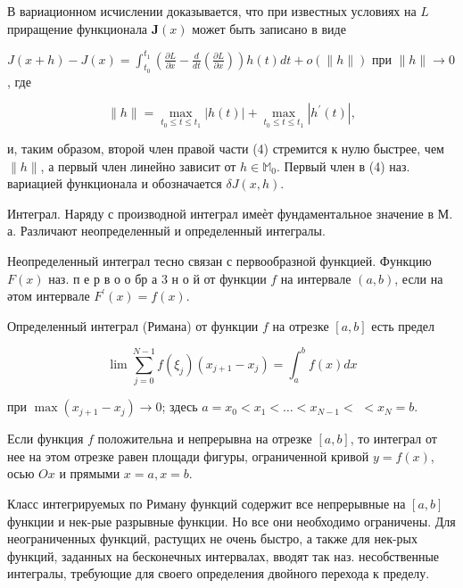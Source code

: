 \documentclass[10pt]{article}
\begin{document}
В вариационном исчислении доказывается, что при известных условиях на $L$ приращение функционала $\boldsymbol{J}(x)$ может быть записано в виде



$J(x+h)-J(x)=\int_{t_{0}}^{t_{1}}\left(\frac{\partial L}{\partial x}-\frac{d}{d t}\left(\frac{\partial L}{\partial x}\right)\right) h(t) d t+o(\|h\|)$ при $\|h\| \rightarrow 0$, где



\[

\|h\|=\max _{t_{0} \leqslant t \leqslant t_{1}}|h(t)|+\max _{t_{0} \leqslant t \leqslant t_{1}}\left|h^{\prime}(t)\right|,

\]



и, таким образом, второй член правой части (4) стремится к нулю быстрее, чем $\|h\|$, а первый член линейно зависит от $h \in \mathbb{M}_{0}$. Первый член в (4) наз. вариацией функционала и обозначается $\delta J(x, h)$.



Интеграл. Наряду с производной интеграл имеѐт фундаментальное значение в М. а. Различают неопределенный и определенный интегралы.



Неопределенный интеграл тесно связан с первообразной функцией. Функцию $F(x)$ наз. п е р в о о бр а 3 н о й от функции $f$ на интервале $(a, b)$, если на әтом интервале $F^{\prime}(x)=f(x)$.



Определенный интеграл (Римана) от функции $f$ на отрезке $[a, b]$ есть предел



\[

\lim \sum_{j=0}^{N-1} f\left(\xi_{j}\right)\left(x_{j+1}-x_{j}\right)=\int_{a}^{b} f(x) d x

\]



при $\max \left(x_{j+1}-x_{j}\right) \rightarrow 0$; здесь $a=x_{0}<x_{1}<\ldots<x_{N-1}<$ $<x_{N}=b$.



Если функция $f$ положительна и непрерывна на отрезке $[a, b]$, то интеграл от нее на этом отрезке равен площади фигуры, ограниченной кривой $y=f(x)$, осью $O x$ и прямыми $x=a, x=b$.



Класс интегрируемых по Риману функций содержит все непрерывные на $[a, b]$ функции и нек-рые разрывные функции. Но все они необходимо ограничены. Для неограниченных функций, растущих не очень быстро, а также для нек-рых функций, заданных на бесконечных интервалах, вводят так наз. несобственные интегралы, требующие для своего определения двойного перехода к пределу.
\end{document}

